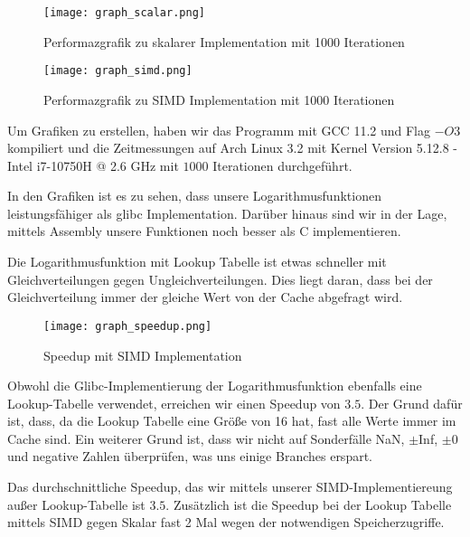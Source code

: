 \begin{figure}[h]
    \centering
    \texttt{[image: graph\_scalar.png]}
    \caption{Performazgrafik zu skalarer Implementation mit 1000 Iterationen}
    \label{fig:graph_scalar}
\end{figure}

\begin{figure}[h]
    \centering
    \texttt{[image: graph\_simd.png]}
    \caption{Performazgrafik zu SIMD Implementation mit 1000 Iterationen}
    \label{fig:graph_simd}
\end{figure}

Um Grafiken zu erstellen, haben wir das Programm mit GCC 11.2 und Flag $-O3$ kompiliert und die Zeitmessungen auf Arch Linux 3.2 mit Kernel Version 5.12.8 - Intel i7-10750H @ 2.6 GHz mit $1000$ Iterationen durchgeführt.

In den Grafiken ist es zu sehen, dass unsere Logarithmusfunktionen leistungsfähiger als glibc Implementation. Darüber hinaus sind wir in der Lage, mittels Assembly unsere Funktionen noch besser als C implementieren.

Die Logarithmusfunktion mit Lookup Tabelle ist etwas schneller mit Gleichverteilungen gegen Ungleichverteilungen. Dies liegt daran, dass bei der Gleichverteilung immer der gleiche Wert von der Cache abgefragt wird.

\begin{figure}[h]
    \centering
    \texttt{[image: graph\_speedup.png]}
    \caption{Speedup mit SIMD Implementation}
    \label{fig:graph_speedup}
\end{figure}

Obwohl die Glibc-Implementierung der Logarithmusfunktion ebenfalls eine Lookup-Tabelle verwendet, erreichen wir einen Speedup von $3.5$. Der Grund dafür ist, dass, da die Lookup Tabelle eine Größe von 16 hat, fast alle Werte immer im Cache sind. Ein weiterer Grund ist, dass wir nicht auf Sonderfälle  NaN, $\pm$Inf, $\pm$0 und negative Zahlen überprüfen, was uns einige Branches erspart.

Das durchschnittliche Speedup, das wir mittels unserer SIMD-Implementiereung außer Lookup-Tabelle ist $3.5$. Zusätzlich ist die Speedup bei der Lookup Tabelle mittels SIMD gegen Skalar fast 2 Mal wegen der notwendigen Speicherzugriffe.